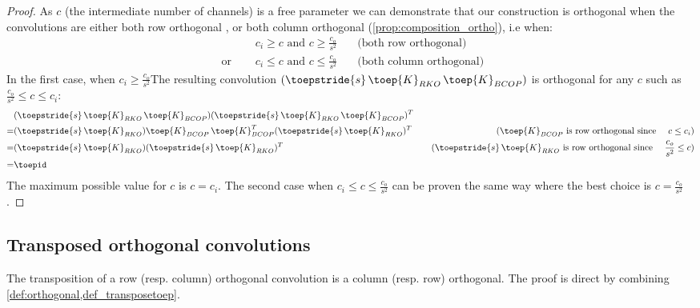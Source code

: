         \begin{proof}
        As $c$ (the intermediate number of channels) is a free parameter we can demonstrate that our construction is orthogonal when  the convolutions are either both row orthogonal , or both column orthogonal (\cref{prop:composition_ortho}), i.e when:
        \begin{align*}
                              & c_i \geq c \text{  and  } c \geq \frac{c_o}{s^2} & \quad \text{(both row orthogonal)}\\
            \text{ or } \quad & c_i \leq c \text{  and  } c \leq \frac{c_o}{s^2} & \quad \text{(both column orthogonal)}
        \end{align*}
        In the first case, when $ c_i \geq \frac{c_o}{s^2}$The resulting convolution $(\toepstride{s} \, \toep{K}_{RKO} \, \toep{K}_{BCOP})$ is orthogonal for any $c$ such as  $ \frac{c_o}{s^2} \leq c \leq c_i$:
        \begin{align*}
            &(\toepstride{s} \, \toep{K}_{RKO} \, \toep{K}_{BCOP})(\toepstride{s} \, \toep{K}_{RKO} \, \toep{K}_{BCOP})^T \\
            = &(\toepstride{s} \, \toep{K}_{RKO})\toep{K}_{BCOP} \, \toep{K}_{BCOP}^T(\toepstride{s} \, \toep{K}_{RKO})^T & \quad (\toep{K}_{BCOP} \text{ is row orthogonal since } \quad c\leq c_i)\\
            = & (\toepstride{s} \, \toep{K}_{RKO})(\toepstride{s} \, \toep{K}_{RKO})^T & \quad (\toepstride{s} \, \toep{K}_{RKO} \text{ is row orthogonal since } \quad \frac{c_o}{s^2} \leq c)\\
            = & \toepid \\
        \end{align*}
        The maximum possible value for $c$ is $c=c_i$. 
        The second case when $c_i \leq c \leq \frac{c_o}{s^2}$ can be proven the same way where the best choice is $c=\frac{c_o}{s^2}$.
        \end{proof}
\subsection{Transposed orthogonal convolutions}
\label{sec:ap_proof_transposed}
The transposition of a row (resp. column) orthogonal convolution is a column (resp. row) orthogonal. The proof is direct by combining \cref{def:orthogonal,def_transposetoep}.

